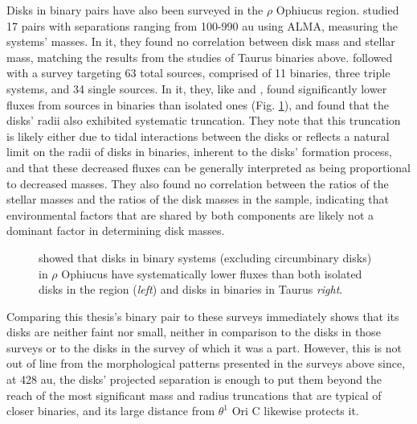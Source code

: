 
Disks in binary pairs have also been surveyed in the $\rho$ Ophiucus region. \citet{Akeson2014} studied 17 pairs with separations ranging from 100-990 au using ALMA, measuring the systems' masses. In it, they found no correlation between disk mass and stellar mass, matching the results from the studies of Taurus binaries above. \citet{Cox2017} followed with a survey targeting 63 total sources, comprised of 11 binaries, three triple systems, and 34 single sources. In it, they, like \citet{Harris2012} and \citet{Akeson2019}, found significantly lower fluxes from sources in binaries than isolated ones (Fig. \ref{fig:rhoOph_binaries}), and found that the disks' radii also exhibited systematic truncation. They note that this truncation is likely either due to tidal interactions between the disks or reflects a natural limit on the radii of disks in binaries, inherent to the disks' formation process, and that these decreased fluxes can be generally interpreted as being proportional to decreased masses. They also found no correlation between the ratios of the stellar masses and the ratios of the disk masses in the sample, indicating that environmental factors that are shared by both components are likely not a dominant factor in determining disk masses.


 \begin{figure}[h]
   \hspace*{\fill}%
   \hspace*{\fill}%
   \caption{\citet{Cox2017} showed that disks in binary systems (excluding circumbinary disks) in $\rho$ Ophiucus have systematically lower fluxes than both isolated disks in the region (\textit{left}) and disks in binaries in Taurus \textit{right}.}
   \label{fig:rhoOph_binaries}
 \end{figure}


Comparing this thesis's binary pair to these surveys immediately shows that its disks are neither faint nor small, neither in comparison to the disks in those surveys or to the disks in the survey of which it was a part. However, this is not out of line from the morphological patterns presented in the surveys above since, at 428 au, the disks' projected separation is enough to put them beyond the reach of the most significant mass and radius truncations that are typical of closer binaries, and its large distance from $\theta^1$ Ori C likewise protects it.









